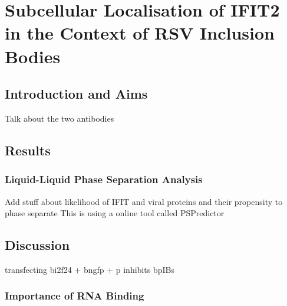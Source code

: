 \chapter{Subcellular Localisation of IFIT2 in the Context of RSV Inclusion Bodies} \label{ch:Subcellular Localisation of IFIT2 in the Context of RSV Inclusion Bodies}
\section{Introduction and Aims} \label{sec:Introduction and Aims-Chapter5}
Talk about the two antibodies

\section{Results} \label{sec:Results-Chapter5}






\subsection{Liquid-Liquid Phase Separation Analysis} \label{subsec:Liquid-Liquid Phase Separation Analysis}
Add stuff about likelihood of IFIT and viral proteins and their propensity to phase separate \newline
This is using a online tool called PSPredictor


\section{Discussion} \label{sec:Discussion-Chapter5}
transfecting bi2f24 + bngfp + p inhibits bpIBs

\subsection{Importance of RNA Binding} \label{subsec:Importance of RNA Binding}
\lipsum[1-3]